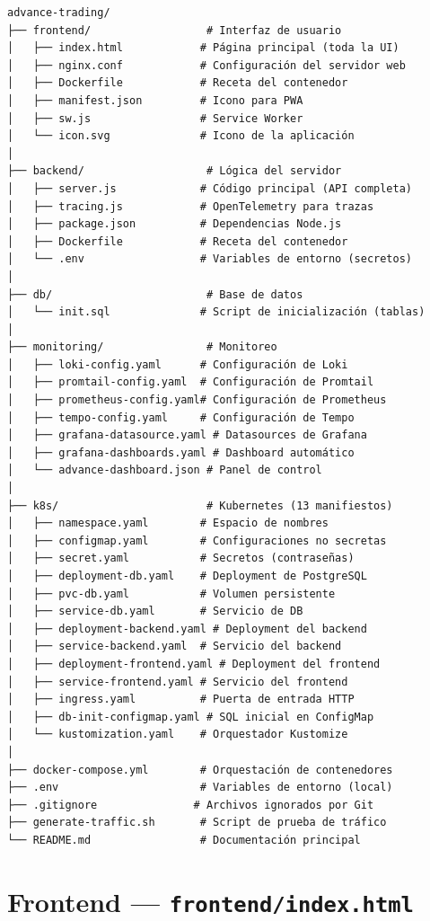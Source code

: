 \documentclass[12pt,oneside]{article}
\begin{document}
\begin{lstlisting}
advance-trading/
├── frontend/                  # Interfaz de usuario
│   ├── index.html            # Página principal (toda la UI)
│   ├── nginx.conf            # Configuración del servidor web
│   ├── Dockerfile            # Receta del contenedor
│   ├── manifest.json         # Icono para PWA
│   ├── sw.js                 # Service Worker
│   └── icon.svg              # Icono de la aplicación
│
├── backend/                   # Lógica del servidor
│   ├── server.js             # Código principal (API completa)
│   ├── tracing.js            # OpenTelemetry para trazas
│   ├── package.json          # Dependencias Node.js
│   ├── Dockerfile            # Receta del contenedor
│   └── .env                  # Variables de entorno (secretos)
│
├── db/                        # Base de datos
│   └── init.sql              # Script de inicialización (tablas)
│
├── monitoring/                # Monitoreo
│   ├── loki-config.yaml      # Configuración de Loki
│   ├── promtail-config.yaml  # Configuración de Promtail
│   ├── prometheus-config.yaml# Configuración de Prometheus
│   ├── tempo-config.yaml     # Configuración de Tempo
│   ├── grafana-datasource.yaml # Datasources de Grafana
│   ├── grafana-dashboards.yaml # Dashboard automático
│   └── advance-dashboard.json # Panel de control
│
├── k8s/                       # Kubernetes (13 manifiestos)
│   ├── namespace.yaml        # Espacio de nombres
│   ├── configmap.yaml        # Configuraciones no secretas
│   ├── secret.yaml           # Secretos (contraseñas)
│   ├── deployment-db.yaml    # Deployment de PostgreSQL
│   ├── pvc-db.yaml           # Volumen persistente
│   ├── service-db.yaml       # Servicio de DB
│   ├── deployment-backend.yaml # Deployment del backend
│   ├── service-backend.yaml  # Servicio del backend
│   ├── deployment-frontend.yaml # Deployment del frontend
│   ├── service-frontend.yaml # Servicio del frontend
│   ├── ingress.yaml          # Puerta de entrada HTTP
│   ├── db-init-configmap.yaml # SQL inicial en ConfigMap
│   └── kustomization.yaml    # Orquestador Kustomize
│
├── docker-compose.yml        # Orquestación de contenedores
├── .env                      # Variables de entorno (local)
├── .gitignore               # Archivos ignorados por Git
├── generate-traffic.sh       # Script de prueba de tráfico
└── README.md                 # Documentación principal
\end{lstlisting}

\section{Frontend — \texttt{frontend/index.html}}
\end{document}
